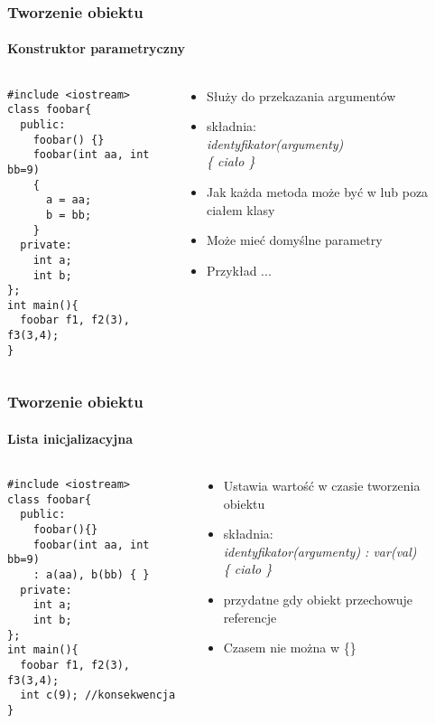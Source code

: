 \documentclass[10pt]{beamer}
\begin{document}
\begin{frame}[fragile]
  \frametitle{Tworzenie obiektu}
  \framesubtitle{Konstruktor parametryczny}
  \begin{columns}
    \begin{column}{0.48\textwidth}
\begin{lstlisting}
#include <iostream>
class foobar{
  public:
    foobar() {}
    foobar(int aa, int bb=9)
    {
      a = aa;
      b = bb;
    }
  private:
    int a;
    int b;
};
int main(){
  foobar f1, f2(3), f3(3,4);
}
\end{lstlisting}
    \end{column}
    \begin{column}{0.48\textwidth}
      \begin{itemize}
        \item Służy do przekazania argumentów
        \item składnia:\\ \textit{identyfikator(argumenty)\\ \{ ciało \}}
        \item Jak każda metoda może być w lub poza ciałem klasy
        \item Może mieć domyślne parametry
        \item Przykład ...
      \end{itemize}
    \end{column}
  \end{columns}
\end{frame}

\begin{frame}[fragile]
  \frametitle{Tworzenie obiektu}
  \framesubtitle{Lista inicjalizacyjna}
  \begin{columns}
    \begin{column}{0.48\textwidth}
\begin{lstlisting}
#include <iostream>
class foobar{
  public:
    foobar(){}
    foobar(int aa, int bb=9)
    : a(aa), b(bb) { }
  private:
    int a;
    int b;
};
int main(){
  foobar f1, f2(3), f3(3,4);
  int c(9); //konsekwencja
}
\end{lstlisting}
    \end{column}
    \begin{column}{0.48\textwidth}
      \begin{itemize}
        \item Ustawia wartość w czasie tworzenia obiektu
        \item składnia:\\ \textit{identyfikator(argumenty) : var(val)\\ \{ ciało \}}
        \item przydatne gdy obiekt przechowuje referencje
        \item Czasem nie można w \{\}
      \end{itemize}
    \end{column}
  \end{columns}
\end{frame}
\end{document}
